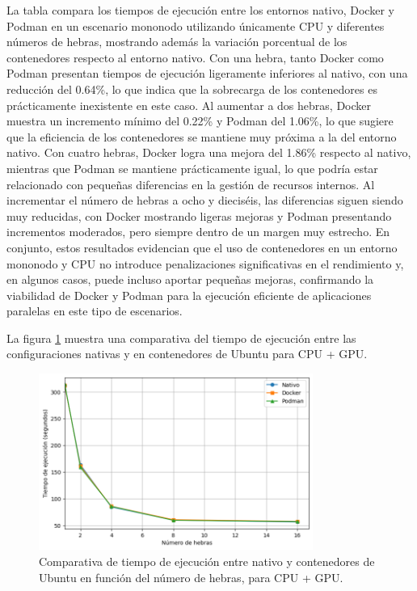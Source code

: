 La tabla compara los tiempos de ejecución entre los entornos nativo, Docker y Podman en un escenario mononodo utilizando únicamente CPU y diferentes números de hebras, mostrando además la variación porcentual de los contenedores respecto al entorno nativo. Con una hebra, tanto Docker como Podman presentan tiempos de ejecución ligeramente inferiores al nativo, con una reducción del 0.64\%, lo que indica que la sobrecarga de los contenedores es prácticamente inexistente en este caso. Al aumentar a dos hebras, Docker muestra un incremento mínimo del 0.22\% y Podman del 1.06\%, lo que sugiere que la eficiencia de los contenedores se mantiene muy próxima a la del entorno nativo. Con cuatro hebras, Docker logra una mejora del 1.86\% respecto al nativo, mientras que Podman se mantiene prácticamente igual, lo que podría estar relacionado con pequeñas diferencias en la gestión de recursos internos. Al incrementar el número de hebras a ocho y dieciséis, las diferencias siguen siendo muy reducidas, con Docker mostrando ligeras mejoras y Podman presentando incrementos moderados, pero siempre dentro de un margen muy estrecho. En conjunto, estos resultados evidencian que el uso de contenedores en un entorno mononodo y CPU no introduce penalizaciones significativas en el rendimiento y, en algunos casos, puede incluso aportar pequeñas mejoras, confirmando la viabilidad de Docker y Podman para la ejecución eficiente de aplicaciones paralelas en este tipo de escenarios.

La figura \ref{fig:single-node_ubuntu_container_vs_native_gpu_time} muestra una comparativa del tiempo de ejecución entre las configuraciones nativas y en contenedores de Ubuntu para CPU + GPU.

\begin{figure}[H]
    \centering
    \includegraphics[width=0.8\textwidth]{imagenes/cap5/single-node_ubuntu_container_vs_native_gpu_time.png}
    \caption{Comparativa de tiempo de ejecución entre nativo y contenedores de Ubuntu en función del número de hebras, para CPU + GPU.}
    \label{fig:single-node_ubuntu_container_vs_native_gpu_time}
\end{figure}

